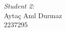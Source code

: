 \begin{titlepage}
\begin{minipage}{0.4\textwidth}
\begin{flushright}
\emph{Student 2:} \\
Aytaç Anıl Durmaz \\[0.5em] %
2237295 \\[1.2em] %
\end{flushright}
\end{minipage}\\[2cm]
\makeatother




\vfill %

\end{titlepage}
